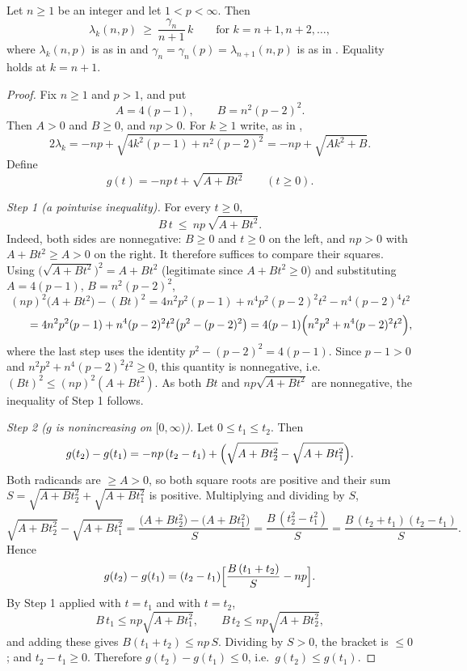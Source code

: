 \begin{lemma}
Let $n\ge1$ be an integer and let $1<p<\infty$.  Then
\[
  \lambda_k(n,p)\ \ge\ \frac{\gamma_n}{n+1}\,k
  \qquad\text{for }k=n+1,n+2,\dots,
\]
where $\lambda_k(n,p)$ is as in  and
$\gamma_n=\gamma_n(p)=\lambda_{n+1}(n,p)$ is as in .
Equality holds at $k=n+1$.
\end{lemma}
\begin{proof}
Fix $n\ge1$ and $p>1$, and put
\[
  A=4(p-1),\qquad B=n^2(p-2)^2 .
\]
Then $A>0$ and $B\ge0$, and $np>0$.  For $k\ge1$ write, as in
,
\[
  2\lambda_k=-np+\sqrt{4k^2(p-1)+n^2(p-2)^2}=-np+\sqrt{A k^2+B}.
\]
Define
\[
  g(t)=-np\,t+\sqrt{A+Bt^2}\qquad(t\ge0).
\]

\emph{Step 1 (a pointwise inequality).}  For every $t\ge0$,
\begin{equation*}
  B\,t\ \le\ np\,\sqrt{A+Bt^2}.
\end{equation*}
Indeed, both sides are nonnegative: $B\ge0$ and $t\ge0$ on the left, and
$np>0$ with $A+Bt^2\ge A>0$ on the right.  It therefore suffices to compare
their squares.  Using $\bigl(\sqrt{A+Bt^2}\bigr)^2=A+Bt^2$ (legitimate since
$A+Bt^2\ge0$) and substituting $A=4(p-1)$, $B=n^2(p-2)^2$,
\[
  (np)^2\bigl(A+Bt^2\bigr)-(Bt)^2
  =4n^2p^2(p-1)+n^4p^2(p-2)^2t^2-n^4(p-2)^4t^2
\]
\[
  \qquad=4n^2p^2(p-1)+n^4(p-2)^2t^2\bigl(p^2-(p-2)^2\bigr)
  =4(p-1)\Bigl(n^2p^2+n^4(p-2)^2t^2\Bigr),
\]
where the last step uses the identity $p^2-(p-2)^2=4(p-1)$.  Since $p-1>0$ and
$n^2p^2+n^4(p-2)^2t^2\ge0$, this quantity is nonnegative, i.e.\
$(Bt)^2\le(np)^2(A+Bt^2)$.  As both $Bt$ and $np\sqrt{A+Bt^2}$ are
nonnegative, the inequality of Step 1 follows.

\emph{Step 2 ($g$ is nonincreasing on $[0,\infty)$).}  Let $0\le t_1\le t_2$.
Then
\[
  g(t_2)-g(t_1)=-np\,(t_2-t_1)+\Bigl(\sqrt{A+Bt_2^2}-\sqrt{A+Bt_1^2}\Bigr).
\]
Both radicands are $\ge A>0$, so both square roots are positive and their sum
$S=\sqrt{A+Bt_2^2}+\sqrt{A+Bt_1^2}$ is positive.  Multiplying and dividing by
$S$,
\[
  \sqrt{A+Bt_2^2}-\sqrt{A+Bt_1^2}
  =\frac{\bigl(A+Bt_2^2\bigr)-\bigl(A+Bt_1^2\bigr)}{S}
  =\frac{B\,(t_2^2-t_1^2)}{S}
  =\frac{B\,(t_2+t_1)(t_2-t_1)}{S}.
\]
Hence
\[
  g(t_2)-g(t_1)=(t_2-t_1)\Bigl[\frac{B\,(t_1+t_2)}{S}-np\Bigr].
\]
By Step 1 applied with $t=t_1$ and with $t=t_2$,
\[
  B\,t_1\le np\sqrt{A+Bt_1^2},\qquad B\,t_2\le np\sqrt{A+Bt_2^2},
\]
and adding these gives $B(t_1+t_2)\le np\,S$.  Dividing by $S>0$, the bracket
is $\le0$; and $t_2-t_1\ge0$.  Therefore $g(t_2)-g(t_1)\le0$, i.e.\
$g(t_2)\le g(t_1)$.


\end{proof}

